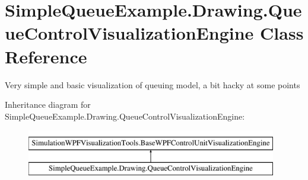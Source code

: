 \hypertarget{class_simple_queue_example_1_1_drawing_1_1_queue_control_visualization_engine}{}\section{Simple\+Queue\+Example.\+Drawing.\+Queue\+Control\+Visualization\+Engine Class Reference}
\label{class_simple_queue_example_1_1_drawing_1_1_queue_control_visualization_engine}


Very simple and basic visualization of queuing model, a bit hacky at some points  


Inheritance diagram for Simple\+Queue\+Example.\+Drawing.\+Queue\+Control\+Visualization\+Engine\+:\begin{figure}[H]
\begin{center}
\leavevmode
\includegraphics[height=2.000000cm]{class_simple_queue_example_1_1_drawing_1_1_queue_control_visualization_engine}
\end{center}
\end{figure}
